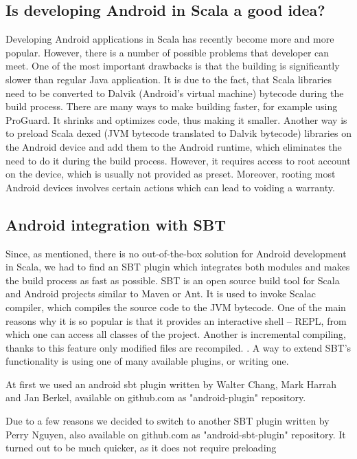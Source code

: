 \subsection{Is developing Android in Scala a good idea?}
\label{subsec:good-idea}
Developing Android applications in Scala has recently become more and more popular. However, there is a number of possible problems that developer can meet. One of the most important drawbacks is that the building is significantly slower than regular Java application. It is due to the fact, that Scala libraries need to be converted to Dalvik (Android's virtual machine) bytecode during the build process. There are many ways to make building faster, for example using ProGuard. It shrinks and optimizes code, thus making it smaller\cite{Berkel:2011:preinstall}. Another way is to preload Scala dexed (JVM bytecode translated to Dalvik bytecode) libraries on the Android device and add them to the Android runtime, which eliminates the need to do it during the build process\cite{Berkel:2011:preinstall}. However, it requires access to root account on the device, which is usually not provided as preset. Moreover, rooting most Android devices involves certain actions which can lead to voiding a warranty. 

\subsection{Android integration with SBT}
\label{subsec:choosing-ide}
Since, as mentioned, there is no out-of-the-box solution for Android development in Scala, we had to find an SBT plugin which integrates both modules and makes the build process as fast as possible. SBT is an open source build tool for Scala and Android projects similar to Maven or Ant. It is used to invoke Scalac compiler, which compiles the source code to the JVM bytecode. One of the main reasons why it is so popular is that it provides an interactive shell -- REPL, from which one can access all classes of the project. Another is incremental compiling, thanks to this feature only modified files are recompiled. \cite{Fatin:2012:NewWay}. A way to extend SBT's functionality is using one of many available plugins, or writing one.

At first we used an android sbt plugin written by Walter Chang, Mark Harrah and Jan Berkel, available on github.com as "android-plugin" repository. 
	
Due to a few reasons we decided to switch to another SBT plugin written by Perry Nguyen, also available on github.com as "android-sbt-plugin" repository. It turned out to be much quicker, as it does not require preloading 





